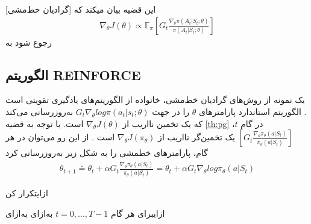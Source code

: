[گرادیان خط‌مشی] این قضیه بیان می\nf کند که
\begin{align}
	\nabla_\theta J(\theta) \propto \mathbb{E}_\pi \left[ G_t \frac{\nabla_\theta \pi (A_t|S_t; \theta)}{\pi(A_t|S_t; \theta)} \right]
	\label{eq:pg}
\end{align}
رجوع شود به 
\cite{suttonbook}

\subsection{الگوریتم REINFORCE}

یک نمونه از روش‌های گرادیان خط‌مشی، خانواده
از الگوریتم‌های یادگیری تقویتی است
\cite{williams1992simple}.
الگوریتم استاندارد  پارامترهای $\theta$ را در جهت 
$G_t \nabla_\theta  log  \pi (a_t|s_t;\theta)$
 به‌روزرسانی می‌کند که یک تخمین نااریب از
$\nabla_\theta J(\theta)$
است.
با توجه به قضیه 
\ref{th:pg}
در گام $t$،
$\left[ G_t \frac{\nabla_\theta \pi_\theta (a|S_t)}{\pi_\theta (a|S_t)} \right]$
یک تخمین‌گر نااریب از $\nabla_\theta J(\pi_\theta)$ است \cite{suttonbook}. از این رو می‌توان در هر گام، پارامترهای خط\nf مشی
 را به شکل زیر به‌روزرسانی کرد
\begin{align}
\theta_{t+1} \doteq \theta_t + \alpha G_t \frac{\nabla_\theta \pi_\theta (a|S_t)}{\pi_\theta (a|S_t)} = \theta_t + \alpha G_t \nabla_\theta log \pi_\theta (a|S_t)
\label{def:updaterule}
\end{align}



‌ازای{تکرار کن}

‌ازای{برای هر گام
$t=0,...,T-1$}
‌به‌ازای
‌به‌ازای

